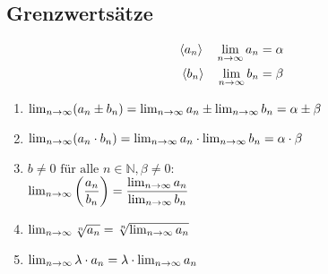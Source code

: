 \subsection{Grenzwertsätze}

\begin{align*}
    \langle a_n \rangle \quad \lim_{n \rightarrow \infty} a_n &= \alpha \\
    \langle b_n \rangle \quad \lim_{n \rightarrow \infty} b_n &= \beta
\end{align*}

\begin{enumerate}
    \item \( \lim_{n \rightarrow \infty} (a_n \pm b_n)
        = \lim_{n \rightarrow \infty} a_n \pm \lim_{n \rightarrow \infty} b_n
        = \alpha \pm \beta \)
    \item \( \lim_{n \rightarrow \infty} (a_n \cdot b_n) 
        = \lim_{n \rightarrow \infty} a_n \cdot \lim_{n \rightarrow \infty} b_n
        = \alpha \cdot \beta \)
    \item \( b \neq 0 \text{ für alle } n \in \mathbb{N},
        \beta \neq 0 \text{:} \) \\
        \( \lim_{n \rightarrow \infty} \left(\dfrac{a_n}{b_n}\right)
        = \dfrac{\lim_{n \rightarrow \infty} a_n}{\lim_{n \rightarrow \infty} b_n} \)
    \item \(
        \lim_{n \rightarrow \infty} \sqrt[n]{a_n}
        = \sqrt[n]{\lim_{n \rightarrow \infty} a_n}
        \)
    \item  \(
        \lim_{n \rightarrow \infty} \lambda \cdot a_n
        = \lambda \cdot \lim_{n \rightarrow \infty} a_n
        \)
\end{enumerate}
